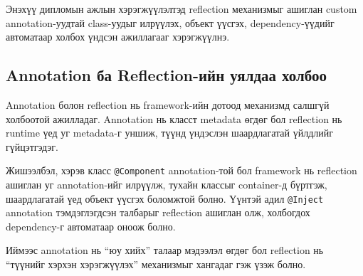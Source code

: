 Энэхүү дипломын ажлын хэрэгжүүлэлтэд reflection механизмыг ашиглан custom annotation-уудтай class-уудыг илрүүлэх, объект үүсгэх, dependency-үүдийг автоматаар холбох үндсэн ажиллагааг хэрэгжүүлнэ.

\subsection{Annotation ба Reflection-ийн уялдаа холбоо}

Annotation болон reflection нь framework-ийн дотоод механизмд салшгүй холбоотой ажилладаг. Annotation нь класст metadata өгдөг бол reflection нь runtime үед уг metadata-г уншиж, түүнд үндэслэн шаардлагатай үйлдлийг гүйцэтгэдэг.

Жишээлбэл, хэрэв класс \texttt{@Component} annotation-той бол framework нь reflection ашиглан уг annotation-ийг илрүүлж, тухайн классыг container-д бүртгэж, шаардлагатай үед объект үүсгэх боломжтой болно. Үүнтэй адил \texttt{@Inject} annotation тэмдэглэгдсэн талбарыг reflection ашиглан олж, холбогдох dependency-г автоматаар оноож болно.

Иймээс annotation нь ``юу хийх'' талаар мэдээлэл өгдөг бол reflection нь ``түүнийг хэрхэн хэрэгжүүлэх'' механизмыг хангадаг гэж үзэж болно.
